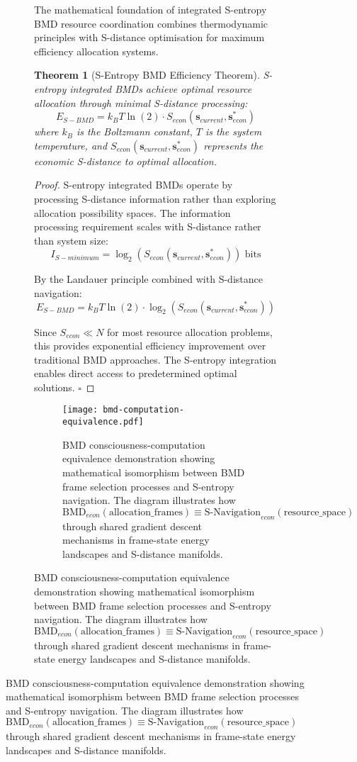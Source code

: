 \documentclass[12pt,a4paper]{article}
\newtheorem{theorem}{Theorem}
\begin{document}
\begin{figure}[H]
\begin{figure}[H]
The mathematical foundation of integrated S-entropy BMD resource coordination combines thermodynamic principles with S-distance optimisation for maximum efficiency allocation systems.

\begin{theorem}[S-Entropy BMD Efficiency Theorem]
S-entropy integrated BMDs achieve optimal resource allocation through minimal S-distance processing:
\begin{equation}
E_{S-BMD} = k_B T \ln(2) \cdot S_{econ}(\mathbf{s}_{current}, \mathbf{s}^*_{econ})
\end{equation}
where $k_B$ is the Boltzmann constant, $T$ is the system temperature, and $S_{econ}(\mathbf{s}_{current}, \mathbf{s}^*_{econ})$ represents the economic S-distance to optimal allocation.
\end{theorem}

\begin{proof}
S-entropy integrated BMDs operate by processing S-distance information rather than exploring allocation possibility spaces. The information processing requirement scales with S-distance rather than system size:
\begin{equation}
I_{S-minimum} = \log_2(S_{econ}(\mathbf{s}_{current}, \mathbf{s}^*_{econ})) \text{ bits}
\end{equation}

By the Landauer principle combined with S-distance navigation:
\begin{equation}
E_{S-BMD} = k_B T \ln(2) \cdot \log_2(S_{econ}(\mathbf{s}_{current}, \mathbf{s}^*_{econ}))
\end{equation}

Since $S_{econ} \ll N$ for most resource allocation problems, this provides exponential efficiency improvement over traditional BMD approaches. The S-entropy integration enables direct access to predetermined optimal solutions. $\square$
\end{proof}

\begin{figure}[H]
\centering
\texttt{[image: bmd-computation-equivalence.pdf]}
\caption{BMD consciousness-computation equivalence demonstration showing mathematical isomorphism between BMD frame selection processes and S-entropy navigation. The diagram illustrates how $\text{BMD}_{econ}(\text{allocation\_frames}) \equiv \text{S-Navigation}_{econ}(\text{resource\_space})$ through shared gradient descent mechanisms in frame-state energy landscapes and S-distance manifolds.}
\label{fig:bmd-computation-equivalence}
\end{figure}


\end{figure}
\end{figure}
\end{document}
